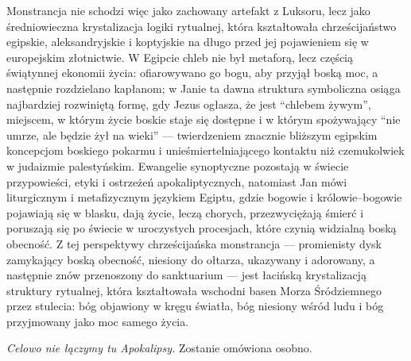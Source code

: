 Monstrancja nie schodzi więc jako zachowany artefakt z Luksoru, lecz jako średniowieczna krystalizacja logiki rytualnej, która kształtowała chrześcijaństwo egipskie, aleksandryjskie i koptyjskie na długo przed jej pojawieniem się w europejskim złotnictwie.
W Egipcie chleb nie był metaforą, lecz częścią świątynnej ekonomii życia: ofiarowywano go bogu, aby przyjął boską moc, a następnie rozdzielano kapłanom; w Janie ta dawna struktura symboliczna osiąga najbardziej rozwiniętą formę, gdy Jezus ogłasza, że jest ``chlebem żywym'', miejscem, w którym życie boskie staje się dostępne i w którym spożywający ``nie umrze, ale będzie żył na wieki'' — twierdzeniem znacznie bliższym egipskim koncepcjom boskiego pokarmu i unieśmiertelniającego kontaktu niż czemukolwiek w judaizmie palestyńskim.
Ewangelie synoptyczne pozostają w świecie przypowieści, etyki i ostrzeżeń apokaliptycznych, natomiast Jan mówi liturgicznym i metafizycznym językiem Egiptu, gdzie bogowie i królowie–bogowie pojawiają się w blasku, dają życie, leczą chorych, przezwyciężają śmierć i poruszają się po świecie w uroczystych procesjach, które czynią widzialną boską obecność.
Z tej perspektywy chrześcijańska monstrancja — promienisty dysk zamykający boską obecność, niesiony do ołtarza, ukazywany i adorowany, a następnie znów przenoszony do sanktuarium — jest łacińską krystalizacją struktury rytualnej, która kształtowała wschodni basen Morza Śródziemnego przez stulecia: bóg objawiony w kręgu światła, bóg niesiony wśród ludu i bóg przyjmowany jako moc samego życia.

\emph{Celowo nie łączymy tu Apokalipsy.}
Zostanie omówiona osobno.

